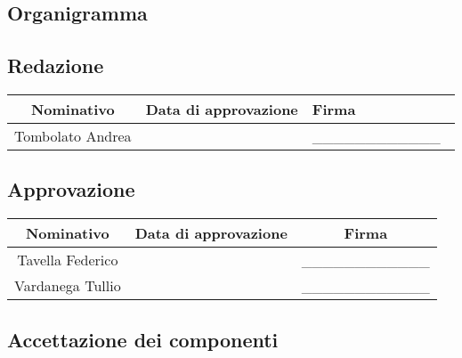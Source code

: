 \documentclass[../PianoProgetto.tex]{subfiles}
\begin{document}
\begin{appendices}
\section{Organigramma}
	\subsection{Redazione}
		\begin{table}[h]
		\begin{tabularx}{\textwidth}{C C X}
			\toprule
			\textbf{Nominativo} & \textbf{Data di approvazione} & \textbf{Firma} \\
			\midrule
			Tombolato Andrea &  & \_\_\_\_\_\_\_\_\_\_\_\_\ \\[1ex]
			\bottomrule
		\end{tabularx}
		
	\end{table}
	

	
	\subsection{Approvazione}
	
		\begin{table}[h]

	
		\begin{tabularx}{\textwidth}{C C C}
			\toprule
			\textbf{Nominativo} & \textbf{Data di approvazione} & \textbf{Firma} \\
			\midrule
			Tavella Federico &  & \_\_\_\_\_\_\_\_\_\_\_\_ \\[1ex]
			Vardanega Tullio &  & \_\_\_\_\_\_\_\_\_\_\_\_ \\[1ex]
			\bottomrule
		\end{tabularx}
		
	\end{table}		
	
	\subsection{Accettazione dei componenti}
	
		\begin{table}[h]
	

\end{table}
\end{appendices}
\end{document}
